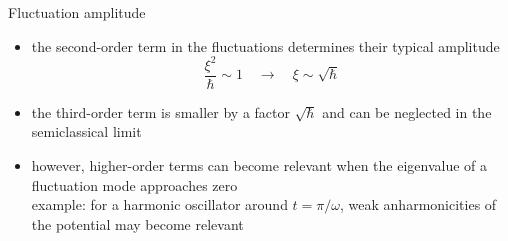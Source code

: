 \documentclass[t,dvipsnames]{beamer}
\begin{document}
\begin{frame}[c]{Fluctuation amplitude}
 \begin{itemize}
  \item the second-order term in the fluctuations determines their typical amplitude
	\begin{displaymath}
         \frac{\xi^2}{\hbar} \sim 1\quad \rightarrow\quad \xi \sim \sqrt{\hbar}
	\end{displaymath}
  \item the third-order term is smaller by a factor $\sqrt{\hbar}$ and can be neglected in the
	semiclassical limit
  \item however, higher-order terms can become relevant when the eigenvalue of a fluctuation
	  mode approaches zero\\[0.1truecm]
	example: for a harmonic oscillator around $t=\pi/\omega$, weak anharmonicities of
		 the potential may become relevant
 \end{itemize}
\end{frame}
\end{document}
